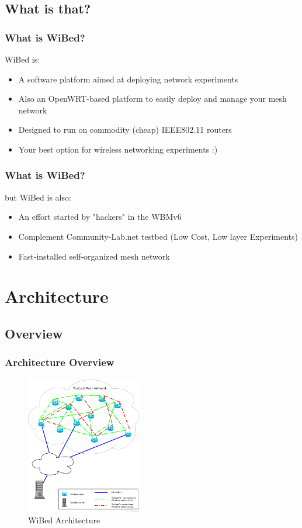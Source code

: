 \documentclass[usepdftitle=false,13pt]{beamer}
\begin{document}
\subsection{What is that?}

\begin{frame}\frametitle{What is WiBed?}

	WiBed is:
	\begin{itemize}
		\item A software platform aimed at deploying network experiments
		\item Also an OpenWRT-based platform to easily deploy and manage your mesh network
		\item Designed to run on commodity (cheap) IEEE802.11 routers
		\item Your best option for wireless networking experiments :)
	\end{itemize}

\end{frame}


\begin{frame}\frametitle{What is WiBed?}

	but WiBed is also:
	\begin{itemize}
		\item An effort started by "hackers" in the WBMv6
		\item Complement Community-Lab.net testbed (Low Cost, Low layer Experiments)
		\item Fast-installed self-organized mesh network
	\end{itemize}

\end{frame}

\section{Architecture}
\subsection{Overview}
\begin{frame}\frametitle{Architecture Overview}

\begin{figure}[h!]
\begin{center}
\includegraphics[width=0.45\textwidth]{pic/wibed_arch}
\caption{WiBed Architecture}
\label{fig:wmn}
\end{center}
\end{figure}

\end{frame}
\end{document}

